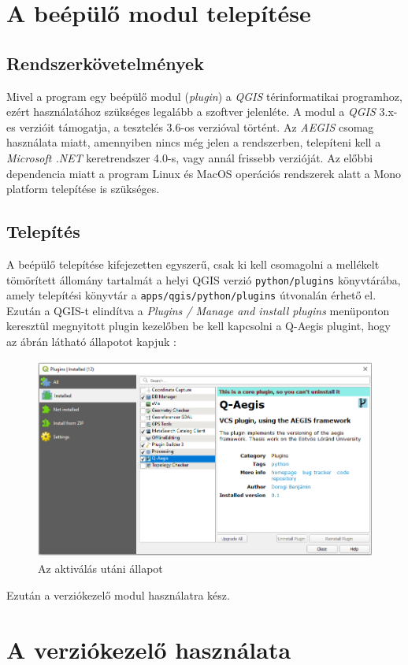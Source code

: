 \section{A beépülő modul telepítése}
\subsection{Rendszerkövetelmények}
Mivel a program egy beépülő modul (\emph{plugin}) a \emph{QGIS} térinformatikai programhoz, ezért használatához szükséges legalább a szoftver jelenléte. A modul a \emph{QGIS} 3.x-es verzióit támogatja, a tesztelés 3.6-os verzióval történt. Az \emph{AEGIS} csomag használata miatt, amennyiben nincs még jelen a rendszerben, telepíteni kell a \emph{Microsoft .NET} keretrendszer 4.0-s, vagy annál frissebb verzióját. Az előbbi dependencia miatt a program Linux és MacOS operációs rendszerek alatt a Mono platform telepítése is szükséges. 
\subsection{Telepítés}
A beépülő telepítése kifejezetten egyszerű, csak ki kell csomagolni a mellékelt tömörített állomány tartalmát a helyi QGIS verzió \texttt{python/plugins} könyvtárába, amely telepítési könyvtár a \texttt{apps/qgis/python/plugins} útvonalán érhető el. Ezután a QGIS-t elindítva a \emph{Plugins / Manage and install plugins} menüponton keresztül megnyitott plugin kezelőben be kell kapcsolni a Q-Aegis plugint, hogy az ábrán látható állapotot kapjuk :
\begin{figure}[H]
	\centering
	\includegraphics[width=\textwidth,height=250px]{images/enable_plugin}
	\caption{Az aktiválás utáni állapot}
	\label{fig:picture-1}
\end{figure}

Ezután a verziókezelő modul használatra kész.
	
\section{A verziókezelő használata}
